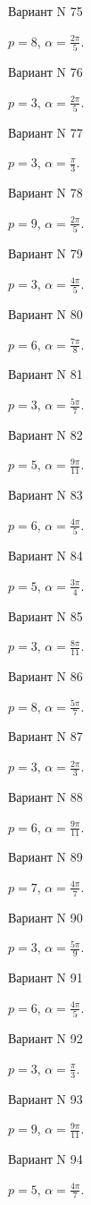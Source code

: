 \documentclass[11pt]{report}
\begin{document}
Вариант N 75

$p = 8$, $\alpha = \frac{2 \pi}{5}$.

Вариант N 76

$p = 3$, $\alpha = \frac{2 \pi}{5}$.

Вариант N 77

$p = 3$, $\alpha = \frac{\pi}{3}$.

Вариант N 78

$p = 9$, $\alpha = \frac{2 \pi}{5}$.

Вариант N 79

$p = 3$, $\alpha = \frac{4 \pi}{5}$.

Вариант N 80

$p = 6$, $\alpha = \frac{7 \pi}{8}$.

Вариант N 81

$p = 3$, $\alpha = \frac{5 \pi}{7}$.

Вариант N 82

$p = 5$, $\alpha = \frac{9 \pi}{11}$.

Вариант N 83

$p = 6$, $\alpha = \frac{4 \pi}{5}$.

Вариант N 84

$p = 5$, $\alpha = \frac{3 \pi}{4}$.

Вариант N 85

$p = 3$, $\alpha = \frac{8 \pi}{11}$.

Вариант N 86

$p = 8$, $\alpha = \frac{5 \pi}{7}$.

Вариант N 87

$p = 3$, $\alpha = \frac{2 \pi}{3}$.

Вариант N 88

$p = 6$, $\alpha = \frac{9 \pi}{11}$.

Вариант N 89

$p = 7$, $\alpha = \frac{4 \pi}{7}$.

Вариант N 90

$p = 3$, $\alpha = \frac{5 \pi}{9}$.

Вариант N 91

$p = 6$, $\alpha = \frac{4 \pi}{5}$.

Вариант N 92

$p = 3$, $\alpha = \frac{\pi}{3}$.

Вариант N 93

$p = 9$, $\alpha = \frac{9 \pi}{11}$.

Вариант N 94

$p = 5$, $\alpha = \frac{4 \pi}{7}$.
\end{document}

